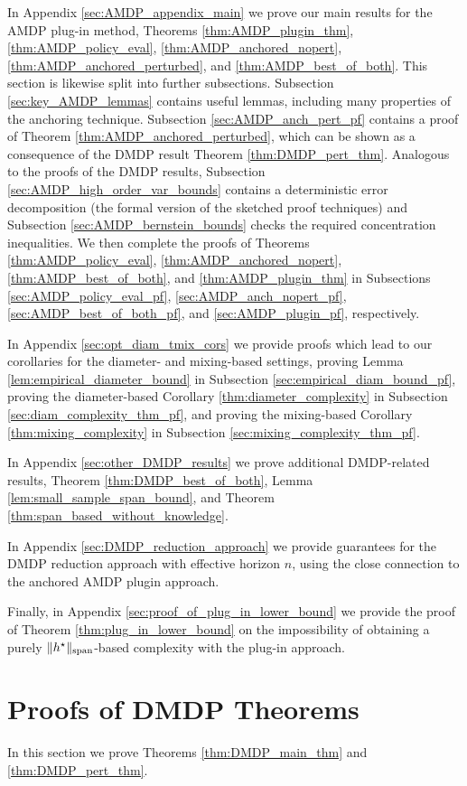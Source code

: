 \documentclass{article}
\theoremstyle{plain}
\theoremstyle{plain}
\theoremstyle{remark}
\theoremstyle{plain}
\theoremstyle{plain}
\newcommand{\plugin}{plug-in\xspace}
\begin{document}
In Appendix \ref{sec:AMDP_appendix_main} we prove our main results for the AMDP \plugin method, Theorems \ref{thm:AMDP_plugin_thm}, \ref{thm:AMDP_policy_eval}, \ref{thm:AMDP_anchored_nopert}, \ref{thm:AMDP_anchored_perturbed}, and \ref{thm:AMDP_best_of_both}. This section is likewise split into further subsections. Subsection \ref{sec:key_AMDP_lemmas} contains useful lemmas, including many properties of the anchoring technique. Subsection \ref{sec:AMDP_anch_pert_pf} contains a proof of Theorem \ref{thm:AMDP_anchored_perturbed}, which can be shown as a consequence of the DMDP result Theorem \ref{thm:DMDP_pert_thm}. Analogous to the proofs of the DMDP results, Subsection \ref{sec:AMDP_high_order_var_bounds} contains a deterministic error decomposition (the formal version of the sketched proof techniques) and Subsection \ref{sec:AMDP_bernstein_bounds} checks the required concentration inequalities. We then complete the proofs of Theorems \ref{thm:AMDP_policy_eval}, \ref{thm:AMDP_anchored_nopert}, \ref{thm:AMDP_best_of_both}, and \ref{thm:AMDP_plugin_thm} in Subsections \ref{sec:AMDP_policy_eval_pf}, \ref{sec:AMDP_anch_nopert_pf}, \ref{sec:AMDP_best_of_both_pf}, and \ref{sec:AMDP_plugin_pf}, respectively.

In Appendix \ref{sec:opt_diam_tmix_cors} we provide proofs which lead to our corollaries for the diameter- and mixing-based settings, proving Lemma \ref{lem:empirical_diameter_bound} in Subsection \ref{sec:empirical_diam_bound_pf}, proving the diameter-based Corollary \ref{thm:diameter_complexity} in Subsection \ref{sec:diam_complexity_thm_pf}, and proving the mixing-based Corollary \ref{thm:mixing_complexity} in Subsection \ref{sec:mixing_complexity_thm_pf}. 

In Appendix \ref{sec:other_DMDP_results} we prove additional DMDP-related results, Theorem \ref{thm:DMDP_best_of_both}, Lemma \ref{lem:small_sample_span_bound}, and  Theorem \ref{thm:span_based_without_knowledge}. 

In Appendix \ref{sec:DMDP_reduction_approach} we provide guarantees for the DMDP reduction approach with effective horizon $n$, using the close connection to the anchored AMDP plugin approach.

Finally, in Appendix \ref{sec:proof_of_plug_in_lower_bound} we provide the proof of Theorem \ref{thm:plug_in_lower_bound} on the impossibility of obtaining a purely $\Vert h^\star\Vert _{\textnormal{span}}$-based complexity with the \plugin approach.

\section{Proofs of DMDP Theorems}
\label{sec:DMDP_appendix_main}
In this section we prove Theorems \ref{thm:DMDP_main_thm} and \ref{thm:DMDP_pert_thm}.
\end{document}
